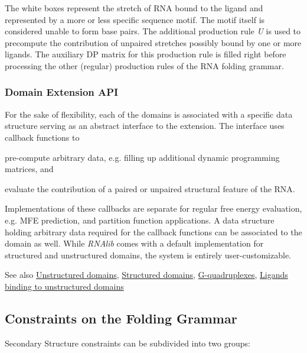 The white boxes represent the stretch of R\+NA bound to the ligand and represented by a more or less specific sequence motif. The motif itself is considered unable to form base pairs. The additional production rule {\itshape U} is used to precompute the contribution of unpaired stretches possibly bound by one or more ligands. The auxiliary DP matrix for this production rule is filled right before processing the other (regular) production rules of the R\+NA folding grammar.\hypertarget{folding_grammar_sec_domains_api}{}\subsubsection{Domain Extension A\+PI}\label{folding_grammar_sec_domains_api}
For the sake of flexibility, each of the domains is associated with a specific data structure serving as an abstract interface to the extension. The interface uses callback functions to


\begin{DoxyItemize}
\item pre-\/compute arbitrary data, e.\+g. filling up additional dynamic programming matrices, and
\item evaluate the contribution of a paired or unpaired structural feature of the R\+NA.
\end{DoxyItemize}

Implementations of these callbacks are separate for regular free energy evaluation, e.\+g. M\+FE prediction, and partition function applications. A data structure holding arbitrary data required for the callback functions can be associated to the domain as well. While {\itshape R\+N\+Alib} comes with a default implementation for structured and unstructured domains, the system is entirely user-\/customizable.

\begin{DoxySeeAlso}{See also}
\hyperlink{group__domains__up}{Unstructured domains}, \hyperlink{group__domains__struc}{Structured domains}, \hyperlink{group__gquads}{G-\/quadruplexes}, \hyperlink{group__ligands__up}{Ligands binding to unstructured domains}
\end{DoxySeeAlso}
\hypertarget{folding_grammar_sec_constraints}{}\subsection{Constraints on the Folding Grammar}\label{folding_grammar_sec_constraints}
Secondary Structure constraints can be subdivided into two groups\+:


